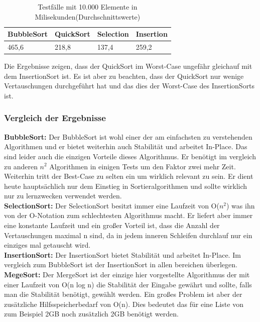 \documentclass{article}
\begin{document}
\begin{table}[h]
\centering
\begin{tabular}{llll}
\hline
\textbf{BubbleSort} & \textbf{QuickSort} & \textbf{Selection} & \textbf{Insertion} \\
\hline
 465,6 & 218,8 & 137,4 & 259,2 \\
\hline
\end{tabular}
\caption{Testfälle mit 10.000 Elemente in Milisekunden(Durchschnittswerte) }
\label{tab:WC_QS}
\end{table}

Die Ergebnisse zeigen, dass der QuickSort im Worst-Case ungefähr gleichauf mit dem InsertionSort ist. Es ist aber zu beachten, dass der QuickSort nur wenige Vertauschungen durchgeführt hat und das dies der Worst-Case des InsertionSorts ist.


\subsubsection{Vergleich der Ergebnisse}

\textbf{BubbleSort:} Der BubbleSort ist wohl einer der am einfachsten zu verstehenden Algorithmen und er bietet weiterhin auch Stabilität und arbeitet In-Place. Das sind leider auch die einzigen Vorteile dieses Algorithmus. Er benötigt im vergleich zu anderen  $n^{2}$ Algorithmen in einigen Tests um den Faktor zwei mehr Zeit. Weiterhin tritt der Best-Case zu selten ein um wirklich relevant zu sein. Er dient heute hauptsächlich nur dem Einstieg in Sortieralgorithmen und sollte wirklich nur zu lernzwecken verwendet werden.\\

\textbf{SelectionSort:} Der SelectionSort besitzt immer eine Laufzeit von O($n^{2}$) was ihn von der O-Notation zum schlechtesten Algorithmus macht. Er liefert aber immer eine konstante Laufzeit und ein großer Vorteil ist, dass die Anzahl der Vertauschungen maximal n sind, da in jedem inneren Schleifen durchlauf nur ein einziges mal getauscht wird. \\

\textbf{InsertionSort:} Der InsertionSort bietet Stabilität und arbeitet In-Place. Im vergleich zum BubbleSort ist der InsertionSort in allen bereichen überlegen.\\

\textbf{MegeSort:} Der MergeSort ist der einzige hier vorgestellte Algorithmus der mit einer Laufzeit von O(n log n) die Stabilität der Eingabe gewährt und sollte, falls man die Stabilität benötigt, gewählt werden.  Ein großes Problem ist aber der zusätzliche Hilfsspeicherbedarf von O(n). Dies bedeutet das für eine Liste von zum Beispiel 2GB noch zusätzlich 2GB benötigt werden.\\
\end{document}
